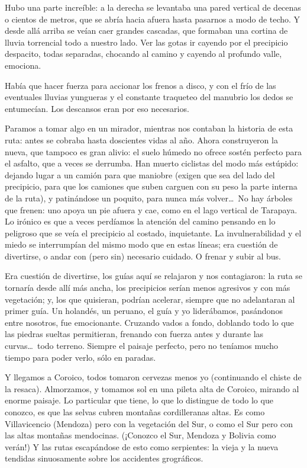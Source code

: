 Hubo una parte increíble: a la derecha se levantaba una pared vertical de
decenas o cientos de metros, que se abría hacia afuera hasta pasarnos a modo de
techo. Y desde allá arriba se veían caer grandes cascadas, que formaban una
cortina de lluvia torrencial todo a nuestro lado. Ver las gotas ir cayendo por
el precipicio despacito, todas separadas, chocando al camino y cayendo al
profundo valle, emociona.

Había que hacer fuerza para accionar los frenos a disco, y con el frío de las
eventuales lluvias yungueras y el constante traqueteo del manubrio los dedos se
entumecían. Los descansos eran por eso necesarios.

Paramos a tomar algo en un mirador, mientras nos contaban la historia de esta
ruta: antes se cobraba hasta doscientes vidas al año. Ahora construyeron la
nueva, que tampoco es gran alivio: el suelo húmedo no ofrece sostén perfecto
para el asfalto, que a veces se derrumba. Han muerto ciclistas del modo más
estúpido: dejando lugar a un camión para que maniobre (exigen que sea del lado
del precipicio, para que los camiones que suben carguen con su peso la parte
interna de la ruta), y patinándose un poquito, para nunca más volver\ldots\ No
hay árboles que frenen: uno apoya un pie afuera y cae, como en el lago vertical
de Tarapaya. Lo irónico es que a veces perdíamos la atención del camino
pensando en lo peligroso que se veía el precipicio al costado, inquietante. La
invulnerabilidad y el miedo se interrumpían del mismo modo que en estas
líneas; era cuestión de divertirse, o andar con (pero sin) necesario cuidado.
O frenar y subir al bus.

Era cuestión de divertirse, los guías aquí se relajaron y nos contagiaron: la
ruta se tornaría desde allí más ancha, los precipicios serían menos
agresivos y con más vegetación; y, los que quisieran, podrían acelerar,
siempre que no adelantaran al primer guía. Un holandés, un peruano, el guía y
yo liderábamos, pasándonos entre nosotros, fue emocionante. Cruzando vados a
fondo, doblando todo lo que las piedras sueltas permitieran, frenando con fuerza
antes y durante las curvas\ldots\ todo terreno. Siempre el paisaje perfecto,
pero no teníamos mucho tiempo para poder verlo, sólo en paradas.

Y llegamos a Coroico, todos tomaron cervezas menos yo (continuando el chiste de
la resaca). Almorzamos, y tomamos sol en una pileta alta de Coroico, mirando al
enorme paisaje. Lo particular que tiene, lo que lo distingue de todo lo que
conozco, es que las selvas cubren montañas cordilleranas altas. Es como
Villavicencio (Mendoza) pero con la vegetación del Sur, o como el Sur pero con
las altas montañas mendocinas. (¡Conozco el Sur, Mendoza y
Bolivia como verán!) Y las rutas escapándose de esto como serpientes: la
vieja y la nueva tendidas sinuosamente sobre los accidentes grográficos.

